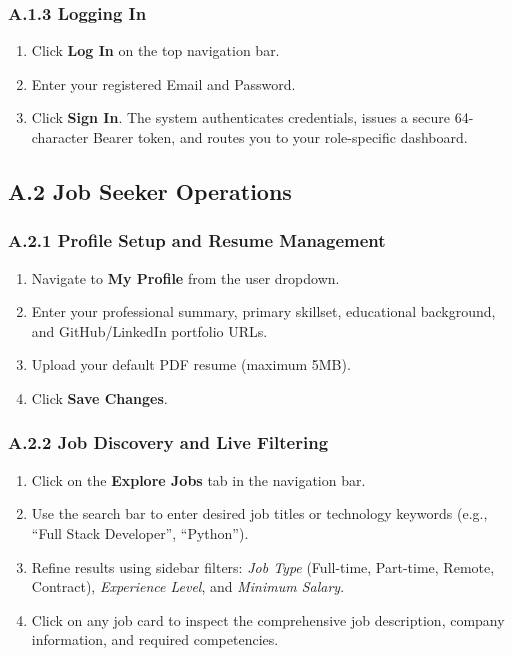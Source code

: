 \subsubsection{A.1.3 Logging In}
\begin{enumerate}
    \item Click \textbf{Log In} on the top navigation bar.
    \item Enter your registered Email and Password.
    \item Click \textbf{Sign In}. The system authenticates credentials, issues a secure 64-character Bearer token, and routes you to your role-specific dashboard.
\end{enumerate}

\subsection{A.2 Job Seeker Operations}
\subsubsection{A.2.1 Profile Setup and Resume Management}
\begin{enumerate}
    \item Navigate to \textbf{My Profile} from the user dropdown.
    \item Enter your professional summary, primary skillset, educational background, and GitHub/LinkedIn portfolio URLs.
    \item Upload your default PDF resume (maximum 5MB).
    \item Click \textbf{Save Changes}.
\end{enumerate}

\subsubsection{A.2.2 Job Discovery and Live Filtering}
\begin{enumerate}
    \item Click on the \textbf{Explore Jobs} tab in the navigation bar.
    \item Use the search bar to enter desired job titles or technology keywords (e.g., ``Full Stack Developer'', ``Python'').
    \item Refine results using sidebar filters: \textit{Job Type} (Full-time, Part-time, Remote, Contract), \textit{Experience Level}, and \textit{Minimum Salary}.
    \item Click on any job card to inspect the comprehensive job description, company information, and required competencies.
\end{enumerate}

